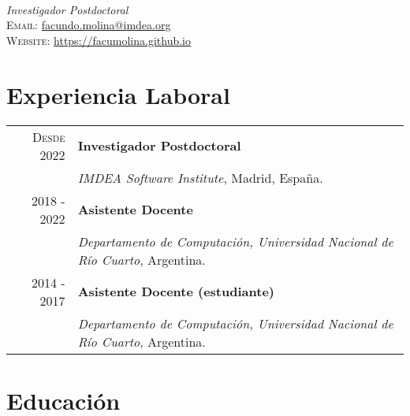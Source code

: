 \documentclass[a4paper,10pt]{article} %
\begin{document}
\pagestyle{empty} %


{} \\
\textit{Investigador Postdoctoral} \\
\textsc{Email:} \href{mailto:facundo.molina@imdea.org}{facundo.molina@imdea.org} \\
\textsc{Website:} \href{https://facumolina.github.io}{https://facumolina.github.io}

\section{Experiencia Laboral}

\begin{tabular}{rl}
\\
\textsc{Desde 2022}	& \textbf{Investigador Postdoctoral} \\
& \textit{IMDEA Software Institute}, Madrid, España. \\

\textsc{2018 - 2022} & \textbf{Asistente Docente} \\ 
& \textit{Departamento de Computación, Universidad Nacional de Río Cuarto}, Argentina. \\

\textsc{2014 - 2017} & \textbf{Asistente Docente (estudiante)} \\
& \textit{Departamento de Computación, Universidad Nacional de Río Cuarto}, Argentina. \\

\end{tabular}


\section{Educación}
\end{document}
